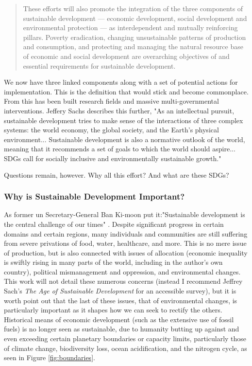 \blockquote{These efforts will also promote the integration of the three components of sustainable development — economic development, social development and environmental protection — as interdependent and mutually reinforcing pillars. Poverty eradication, changing unsustainable patterns of production and
consumption, and protecting and managing the natural resource base of economic and social development are overarching objectives of and essential requirements for sustainable development.}

We now have three linked components along with a set of potential actions for implementation. This is the definition that would stick and become commonplace. From this has been built research fields and massive multi-governmental interventions. Jeffery Sachs describes this further, "As an intellectual pursuit, sustainable development tries to make sense of the interactions of three complex systems: the world economy, the global society, and the Earth's physical environment... Sustainable development is also a normative outlook of the world, meaning that it recommends a set of goals to which the world should aspire... SDGs call for socially inclusive and environmentally sustainable growth." \cite{sachsAgeSustainableDevelopment2015}

Questions remain, however. Why all this effort? And what are these SDGs?

\subsubsection{Why is Sustainable Development Important?}

As former \ac{un} Secretary-General Ban Ki-moon put it:"Sustainable development is the central challenge of our times" \cite{sachsAgeSustainableDevelopment2015}. Despite significant progress in certain domains and certain regions, many individuals and communities are still suffering from severe privations of food, water, healthcare, and more. This is no mere issue of production, but is also connected with issues of allocation (economic inequality is swiftly rising in many parts of the world, including in the author's own country), political mismanagement and oppression, and environmental changes. This work will not detail these numerous concerns (instead I recommend Jeffrey Sach's \textit{The Age of Sustainable Development} for an accessible survey), but it is worth point out that the last of these issues, that of environmental changes, is particularly important as it shapes how we can seek to rectify the others. Historical means of economic development (such as the extensive use of fossil fuels) is no longer seen as sustainable, due to humanity butting up against and even exceeding certain planetary boundaries or capacity limits, particularly those of climate change, biodiversity loss, ocean acidification, and the nitrogen cycle, as seen in Figure \ref{fig:boundaries}.

